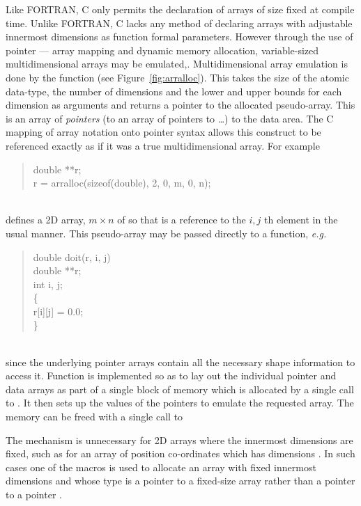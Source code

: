\documentclass[a4paper,twoside]{report}
\newcommand{\Litf}{\ttfamily\upshape\mdseries}
\newcommand{\eg}{\emph{e.g.}}
\begin{document}
Like FORTRAN, C only permits the declaration of arrays of size fixed
at compile time. Unlike FORTRAN, C lacks any method of declaring
arrays with adjustable innermost dimensions as function formal
parameters.  However through the use of pointer --- array mapping and
dynamic memory allocation, variable-sized multidimensional arrays may
be emulated\cite[p107]{kernighan:88},\cite[pp 20--23]{press:92C}.
Multidimensional array emulation is done by the function
 (see Figure~\ref{fig:arralloc}). This takes the size
of the atomic data-type, the number of dimensions and the lower and
upper bounds for each dimension as arguments and returns a pointer to
the allocated pseudo-array. This is an array of \emph{pointers} (to an
array of pointers to \ldots) to the data area.  The C mapping of array
notation onto pointer syntax allows this construct to be referenced
exactly as if it was a true multidimensional array. For example\\
\parbox{\textwidth}{%
\begin{quote}
  \Litf
double **r;\\
r = arralloc(sizeof(double), 2, 0, m, 0, n);
\end{quote}}\\
\noindent defines a 2D array, $m \times n$ of  so that
 is a reference to the $i, j$ th element in the usual
manner. This pseudo-array may be passed directly to a function, \eg\\
\parbox{\textwidth}{%
\begin{quote}
  \Litf
double doit(r, i, j)\\
double **r;\\
int    i, j;\\
\{\\
\hspace*{1cm} r[i][j] = 0.0;\\
\}
\end{quote}}\\
\noindent
since the underlying pointer arrays contain all the necessary shape
information to access it. Function  is implemented so
as to lay out the individual pointer and data arrays as part of a
single block of memory which is allocated by a single call to
. It then sets up the values of the pointers to emulate
the requested array. The memory can be freed with a single call to

The  mechanism is unnecessary for 2D arrays where
the innermost dimensions are fixed, such as for an array of position
co-ordinates which has dimensions \Lit{[n][3]}.  In such cases one
of the  macros is used to allocate an array
with fixed innermost dimensions and whose type is a pointer to a
fixed-size array  rather than a pointer to a
pointer .
\end{document}
